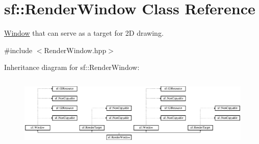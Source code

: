 \hypertarget{classsf_1_1_render_window}{\section{sf\-:\-:Render\-Window Class Reference}
\label{classsf_1_1_render_window}
}


\hyperlink{classsf_1_1_window}{Window} that can serve as a target for 2\-D drawing.  




{\ttfamily \#include $<$Render\-Window.\-hpp$>$}

Inheritance diagram for sf\-:\-:Render\-Window\-:\begin{figure}[H]
\begin{center}
\leavevmode
\includegraphics[height=3.471074cm]{classsf_1_1_render_window}
\end{center}
\end{figure}
